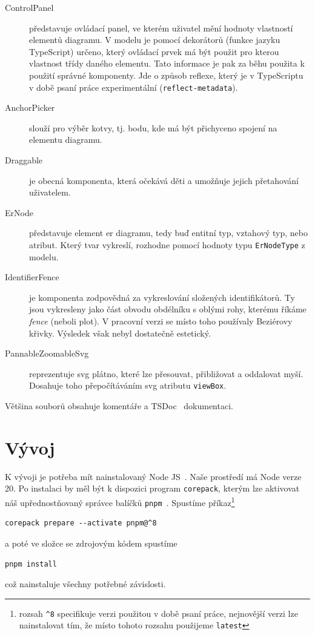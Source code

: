 \begin{description}
  \item[ControlPanel] představuje ovládací panel, ve kterém uživatel mění hodnoty vlastností elementů diagramu.
    V modelu je pomocí dekorátorů (funkce jazyku TypeScript) určeno, který ovládací prvek má být použit pro kterou vlastnost třídy daného elementu.
    Tato informace je pak za běhu použita k použití správné komponenty.
    Jde o způsob reflexe, který je v TypeScriptu v době psaní práce experimentální (\texttt{reflect-metadata}).
  \item[AnchorPicker] slouží pro výběr kotvy, tj. bodu, kde má být přichyceno spojení na elementu diagramu.
  \item[Draggable] je obecná komponenta, která očekává děti a umožňuje jejich přetahování uživatelem.
  \item[ErNode] představuje element \acrshort{er} diagramu, tedy buď entitní typ, vztahový typ, nebo atribut.
    Který tvar vykreslí, rozhodne pomocí hodnoty typu \texttt{ErNodeType} z modelu.
  \item[IdentifierFence] je komponenta zodpovědná za vykreslování složených identifikátorů.
    Ty jsou vykresleny jako část obvodu obdélníku s oblými rohy, kterému říkáme \emph{fence} (neboli plot).
    V pracovní verzi se místo toho používaly Beziérovy křivky.
    Výsledek však nebyl dostatečně estetický.
  \item[PannableZoomableSvg] reprezentuje \acrshort{svg} plátno, které lze přesouvat, přibližovat a oddalovat myší.
    Dosahuje toho přepočítáváním \acrshort{svg} atributu \texttt{viewBox}.
\end{description}

Většina souborů obsahuje komentáře a TSDoc~\cite{microsoft_whattsdoc_2023} dokumentaci.

\section{Vývoj}\label{section:development}

K vývoji je potřeba mít nainstalovaný Node JS~\cite{openjsfoundation_nodejs_2023}.
Naše prostředí má Node verze 20.
Po instalaci by měl být k dispozici program \texttt{corepack}, kterým lze aktivovat náš upřednostňovaný správce balíčků \texttt{pnpm}~\cite{pnpm_pnpmfast_2023}.
Spustíme příkaz\footnote{rozsah \texttt{\^{}8} specifikuje verzi použitou v době psaní práce, nejnovější verzi lze nainstalovat tím, že místo tohoto rozsahu použijeme \texttt{latest}}
\begin{verbatim}
corepack prepare --activate pnpm@^8
\end{verbatim}
a poté ve složce  se zdrojovým kódem spustíme
\begin{verbatim}
pnpm install
\end{verbatim}
což nainstaluje všechny potřebné závislosti.

